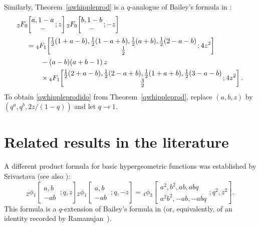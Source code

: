 Similarly, Theorem~\ref{qwhippleprod} is a $q$-analogue of Bailey's
formula in \cite[p.~245, Equation~(2.08)]{B}:
\begin{align}\label{qwhippleprodido}
{}_2F_0\!&\left[\begin{matrix}a,1-a\\
-\end{matrix}\,;z\right]
{}_2F_0\!\left[\begin{matrix}b,1-b\\
-\end{matrix}\,;-z\right]\notag\\[.2em]
&{}={}_4F_1\!\left[\begin{matrix}\frac 12(1+a-b),\frac 12(1-a+b),
\frac 12(a+b),\frac 12(2-a-b)\\[.1em]
\frac 12\end{matrix}\,;4z^2\right]\notag\\[.1em]
&\qquad{}-(a-b)(a+b-1)\,z\notag\\
&\qquad\times{}_4F_1\!\left[\begin{matrix}\frac 12(2+a-b),\frac 12(2-a+b),
\frac 12(1+a+b),\frac 12(3-a-b)\\[.1em]
\frac 32\end{matrix}\,;4z^2\right].
\end{align}
To obtain \eqref{qwhippleprodido} from Theorem~\ref{qwhippleprod},
replace $(a,b,z)$ by $(q^a,q^b,2z/(1-q))$ and let $q\to 1$.

\section{Related results in the literature}

A different product formula for basic hypergeometric functions
was established by Srivastava \cite[Eq.~(21)]{S1} (see also
\cite[Eq.~(3.13)]{S2}):
\begin{equation}
{}_2\phi_1\!\left[\begin{matrix}a,b\\
-ab\end{matrix}\,;q,z\right]
{}_2\phi_1\!\left[\begin{matrix}a,b\\
-ab\end{matrix}\,;q,-z\right]
={}_4\phi_3\!\left[\begin{matrix}a^2,b^2,ab,abq\\
a^2b^2,-ab,-abq\end{matrix};q^2,z^2\right].
\end{equation}
This formula is a $q$-extension of Bailey's formula in
\cite[p.~245, Equation~(2.08)]{B}
(or, equivalently, of an identity recorded by
Ramanujan~\cite[Ch.\ 13, Entry 24]{R}).

